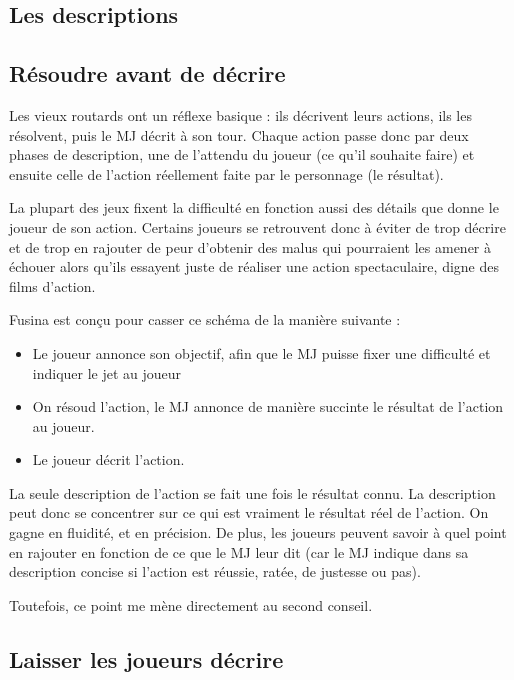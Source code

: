 \begin{multicols}{2}

\section{Les descriptions}

\subsection{Résoudre avant de décrire}

Les vieux routards ont un réflexe basique : ils décrivent leurs actions, ils les résolvent, puis le MJ décrit à son tour. Chaque action passe donc par deux phases de description, une de l'attendu du joueur (ce qu'il souhaite faire) et ensuite celle de l'action réellement faite par le personnage (le résultat). 

La plupart des jeux fixent la difficulté en fonction aussi des détails que donne le joueur de son action. Certains joueurs se retrouvent donc à éviter de trop décrire et de trop en rajouter de peur d'obtenir des malus qui pourraient les amener à échouer alors qu'ils essayent juste de réaliser une action spectaculaire, digne des films d'action.

Fusina est conçu pour casser ce schéma de la manière suivante :

\begin{itemize}
\item Le joueur annonce son objectif, afin que le MJ puisse fixer une difficulté et indiquer le jet au joueur
\item On résoud l'action, le MJ annonce de manière succinte le résultat de l'action au joueur.
\item Le joueur décrit l'action.
\end{itemize}

La seule description de l'action se fait une fois le résultat connu. La description peut donc se concentrer sur ce qui est vraiment le résultat réel de l'action. On gagne en fluidité, et en précision. De plus, les joueurs peuvent savoir à quel point en rajouter en fonction de ce que le MJ leur dit (car le MJ indique dans sa description concise si l'action est réussie, ratée, de justesse ou pas).

Toutefois, ce point me mène directement au second conseil.

\subsection{Laisser les joueurs décrire}


\end{multicols}

